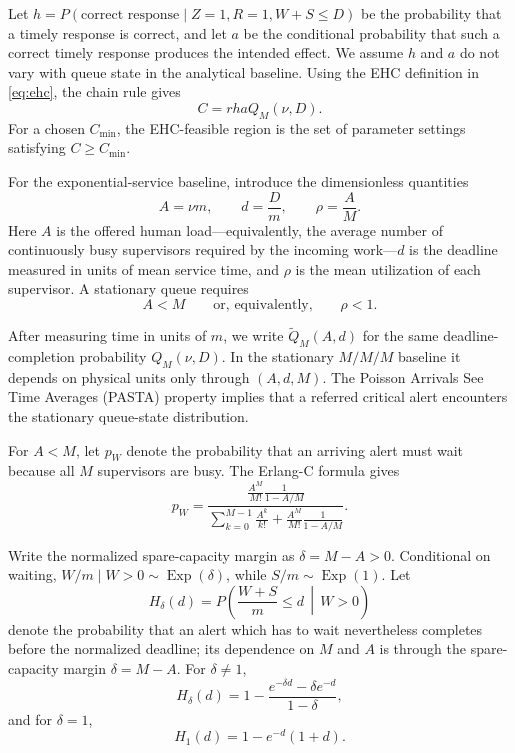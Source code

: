 \documentclass[letterpaper,10pt,conference]{ieeeconf}
\begin{document}
Let \(h=P(\text{correct response}\mid Z=1,R=1,W+S\le D)\) be the
probability that a timely response is correct, and let \(a\) be the
conditional probability that such a correct timely response produces the
intended effect. We assume \(h\) and \(a\) do not vary with queue state in
the analytical baseline. Using the EHC definition in \eqref{eq:ehc}, the
chain rule gives
\begin{equation}
\boxed{
C=rhaQ_M(\nu,D).
}
\label{eq:main}
\end{equation}
For a chosen \(C_{\min}\), the EHC-feasible region is the set of parameter
settings satisfying \(C\ge C_{\min}\).

For the exponential-service baseline, introduce the dimensionless quantities
\begin{equation}
A=\nu m,
\qquad
d=\frac{D}{m},
\qquad
\rho=\frac{A}{M}.
\label{eq:dimensionless}
\end{equation}
Here \(A\) is the offered human load---equivalently, the average number of
continuously busy supervisors required by the incoming work---\(d\) is the
deadline measured in units of mean service time, and \(\rho\) is the mean
utilization of each supervisor. A stationary queue requires
\begin{equation}
A<M
\qquad\text{or, equivalently,}\qquad
\rho<1.
\end{equation}

After measuring time in units of \(m\), we write \(\widetilde Q_M(A,d)\) for
the same deadline-completion probability \(Q_M(\nu,D)\). In the stationary
\(M/M/M\) baseline it depends on physical units only through \((A,d,M)\).
The Poisson Arrivals See Time Averages (PASTA) property implies that a referred
critical alert encounters the stationary queue-state distribution.

For \(A<M\), let \(p_W\) denote the probability that an arriving alert must
wait because all \(M\) supervisors are busy. The Erlang-C formula gives
\begin{equation}
p_W=
\frac{\frac{A^M}{M!}\frac{1}{1-A/M}}
{\displaystyle
 \sum_{k=0}^{M-1}\frac{A^k}{k!}
 +
 \frac{A^M}{M!}\frac{1}{1-A/M}}.
\label{eq:erlangc}
\end{equation}

Write the normalized spare-capacity margin as \(\delta=M-A>0\). Conditional
on waiting, \(W/m\mid W>0\sim\operatorname{Exp}(\delta)\), while
\(S/m\sim\operatorname{Exp}(1)\).
Let
\begin{equation}
H_{\delta}(d)
=
P\left(
\frac{W+S}{m}\leq d
\,\middle|\,
W>0
\right)
\end{equation}
denote the probability that an alert which has to wait nevertheless completes
before the normalized deadline; its dependence on \(M\) and \(A\) is through
the spare-capacity margin \(\delta=M-A\). For \(\delta\neq1\),
\begin{equation}
H_{\delta}(d)
=
1-
\frac{e^{-\delta d}-\delta e^{-d}}
     {1-\delta},
\label{eq:hdelta}
\end{equation}
and for \(\delta=1\),
\begin{equation}
H_{1}(d)
=
1-e^{-d}(1+d).
\label{eq:hdelta-one}
\end{equation}
\end{document}
